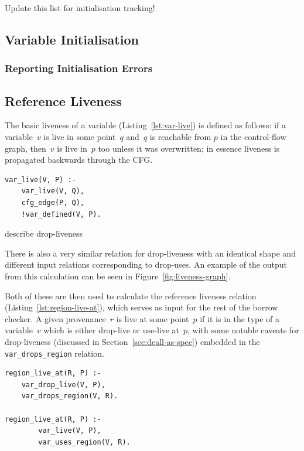 \documentclass[11pt,a4paper,twoside,openany]{report}
\newcommand{\fixme}[1] {{\color{red}#1}}
\newenvironment{sourcecode}{\captionsetup{type=listing}}{}
\newcommand{\InDatalog}[1]{\texttt{#1}}
\begin{document}
\fixme{Update this list for initialisation tracking!}

\subsection{Variable Initialisation}
\label{sec:var-initalisation}

\subsubsection{Reporting Initialisation Errors}
\label{sec:initialisation:errors}

\subsection{Reference Liveness}
\label{sec:var-livenes}

The basic liveness of a variable (Listing~\ref{lst:var-live}) is defined as
follows: if a variable~$v$ is live in some point~$q$ and~$q$ is reachable from
$p$ in the control-flow graph, then~$v$ is live in~$p$ too unless it was
overwritten; in essence liveness is propagated backwards through the CFG.

\begin{sourcecode}
  \label{lst:var-live}
\begin{verbatim}
var_live(V, P) :-
    var_live(V, Q),
    cfg_edge(P, Q),
    !var_defined(V, P).
\end{verbatim}
\end{sourcecode}

\fixme{describe drop-liveness}

There is also a very similar relation for drop-liveness with an identical shape
and different input relations corresponding to drop-uses. An example of the
output from this calculation can be seen in Figure~\ref{fig:liveness-graph}.

Both of these are then used to calculate the reference liveness relation
(Listing~\ref{lst:region-live-at}), which serves as input for the rest of the
borrow checker. A given provenance~$r$ is live at some point~$p$ if it is in the
type of a variable~$v$ which is either drop-live or use-live at~$p$, with some
notable caveats for drop-liveness (discussed in Section~\ref{sec:deall-as-spec})
embedded in the \InDatalog{var_drops_region} relation.

\begin{sourcecode}
  \label{lst:region-live-at}
\begin{verbatim}
region_live_at(R, P) :-
    var_drop_live(V, P),
    var_drops_region(V, R).
        
region_live_at(R, P) :-
        var_live(V, P),
        var_uses_region(V, R).
\end{verbatim}
\end{sourcecode}
\end{document}
